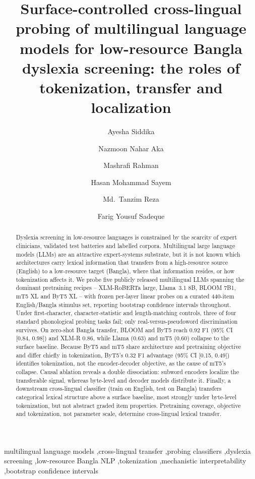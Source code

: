 \documentclass[preprint,12pt]{elsarticle}
\begin{document}
\begin{frontmatter}

\title{Surface-controlled cross-lingual probing of multilingual language models for low-resource Bangla dyslexia screening: the roles of tokenization, transfer and localization}

\author[bracu]{Ayesha Siddika}
\author[bracu]{Nazmoon Nahar Aka}
\author[bracu]{Mashrafi Rahman}
\author[bracu]{Hasan Mohammad Sayem}
\author[bracu]{Md.\ Tanzim Reza}
\author[bracu]{Farig Yousuf Sadeque}



\begin{abstract}
Dyslexia screening in low-resource languages is constrained by the scarcity of expert clinicians, validated test batteries and labelled corpora. Multilingual large language models (LLMs) are an attractive expert-systems substrate, but it is not known which architectures carry lexical information that transfers from a high-resource source (English) to a low-resource target (Bangla), where that information resides, or how tokenization affects it. We probe five publicly released multilingual LLMs spanning the dominant pretraining recipes -- XLM-RoBERTa large, Llama~3.1 8B, BLOOM 7B1, mT5 XL and ByT5 XL -- with frozen per-layer linear probes on a curated 440-item English/Bangla stimulus set, reporting bootstrap confidence intervals throughout. Under first-character, character-statistic and length-matching controls, three of four standard phonological probing tasks fail; only real-versus-pseudoword discrimination survives. On zero-shot Bangla transfer, BLOOM and ByT5 reach 0.92 F1 (95\% CI [0.84, 0.98]) and XLM-R 0.86, while Llama (0.63) and mT5 (0.60) collapse to the surface baseline. Because ByT5 and mT5 share architecture and pretraining objective and differ chiefly in tokenization, ByT5's 0.32 F1 advantage (95\% CI [0.15, 0.49]) identifies tokenization, not the encoder-decoder objective, as the cause of mT5's collapse. Causal ablation reveals a double dissociation: subword encoders localize the transferable signal, whereas byte-level and decoder models distribute it. Finally, a downstream cross-lingual classifier (train on English, test on Bangla) transfers categorical lexical structure above a surface baseline, most strongly under byte-level tokenization, but not abstract graded item properties. Pretraining coverage, objective and tokenization, not parameter scale, determine cross-lingual lexical transfer.
\end{abstract}

\begin{keyword}
multilingual language models \sep cross-lingual transfer \sep probing classifiers \sep dyslexia screening \sep low-resource Bangla NLP \sep tokenization \sep mechanistic interpretability \sep bootstrap confidence intervals
\end{keyword}

\end{frontmatter}
\end{document}
